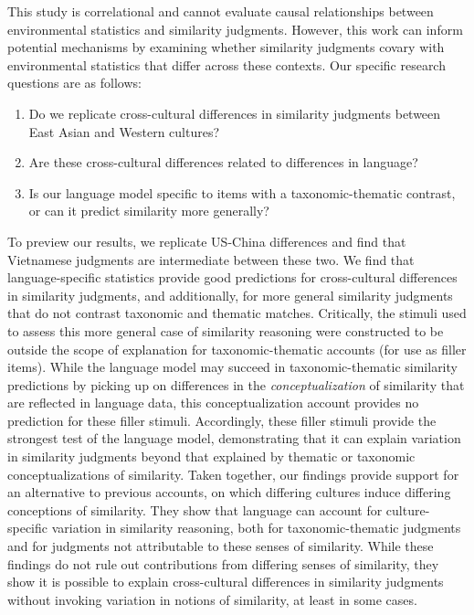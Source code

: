 \documentclass[10pt, letterpaper]{article}
\begin{document}
This study is correlational and cannot evaluate causal relationships
between environmental statistics and similarity judgments. However, this
work can inform potential mechanisms by examining whether similarity
judgments covary with environmental statistics that differ across these
contexts. Our specific research questions are as follows:~

\begin{enumerate}
\def\labelenumi{\arabic{enumi}.}
\item
  Do we replicate cross-cultural differences in similarity judgments
  between East Asian and Western cultures?
\item
  Are these cross-cultural differences related to differences in
  language?
\item
  Is our language model specific to items with a taxonomic-thematic
  contrast, or can it predict similarity more generally?~
\end{enumerate}

To preview our results, we replicate US-China differences and find that
Vietnamese judgments are intermediate between these two. We find that
language-specific statistics provide good predictions for cross-cultural
differences in similarity judgments, and additionally, for more general
similarity judgments that do not contrast taxonomic and thematic
matches. Critically, the stimuli used to assess this more general case
of similarity reasoning were constructed to be outside the scope of
explanation for taxonomic-thematic accounts (for use as filler items).
While the language model may succeed in taxonomic-thematic similarity
predictions by picking up on differences in the \emph{conceptualization}
of similarity that are reflected in language data, this
conceptualization account provides no prediction for these filler
stimuli. Accordingly, these filler stimuli provide the strongest test of
the language model, demonstrating that it can explain variation in
similarity judgments beyond that explained by thematic or taxonomic
conceptualizations of similarity. Taken together, our findings provide
support for an alternative to previous accounts, on which differing
cultures induce differing conceptions of similarity. They show that
language can account for culture-specific variation in similarity
reasoning, both for taxonomic-thematic judgments and for judgments not
attributable to these senses of similarity. While these findings do not
rule out contributions from differing senses of similarity, they show it
is possible to explain cross-cultural differences in similarity
judgments without invoking variation in notions of similarity, at least
in some cases.
\end{document}
